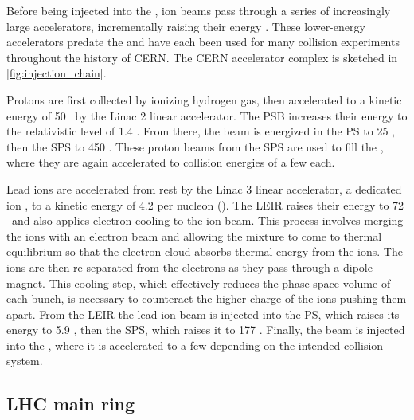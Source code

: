Before being injected into the \lhc, ion beams pass through a series of increasingly large accelerators, incrementally raising their energy \cite{Benedikt:2004wm}.
These lower-energy accelerators predate the \lhc and have each been used for many collision experiments throughout the history of CERN.
The CERN accelerator complex is sketched in \cref{fig:injection_chain}.

Protons are first collected by ionizing hydrogen gas, then accelerated to a kinetic energy of 50 \MeV\ by the Linac 2 linear accelerator.
The \ac{PSB} increases their energy to the relativistic level of 1.4 \GeV.
From there, the beam is energized in the \ac{PS} to 25 \GeV, then the \ac{SPS} to 450 \GeV.
These proton beams from the \ac{SPS} are used to fill the \lhc, where they are again accelerated to collision energies of a few \TeV each.

Lead ions are accelerated from rest by the Linac 3 linear accelerator, a dedicated ion \linac, to a kinetic energy of 4.2 \MeV per nucleon (\MeVn).
The \ac{LEIR} raises their energy to 72 \MeVn\ and also applies electron cooling to the ion beam.
This process involves merging the ions with an electron beam and allowing the mixture to come to thermal equilibrium so that the electron cloud absorbs thermal energy from the ions.
The ions are then re-separated from the electrons as they pass through a dipole magnet.
This cooling step, which effectively reduces the phase space volume of each bunch, is necessary to counteract the higher charge of the ions pushing them apart. %
From the \ac{LEIR} the lead ion beam is injected into the PS, which raises its energy to 5.9 \GeVn, then the \ac{SPS}, which raises it to 177 \GeVn.
Finally, the beam is injected into the \lhc, where it is accelerated to a few \TeVn depending on the intended collision system.


\subsection{LHC main ring}

